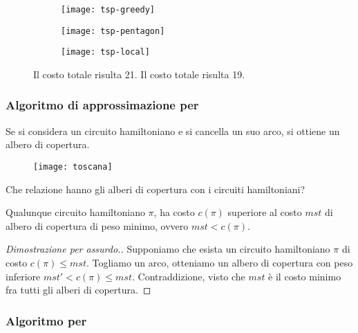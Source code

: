 \begin{figure}[H]\centering
	\hfill
	\begin{subfigure}[c]{.22\linewidth}\centering
		\texttt{[image: tsp-greedy]}
	\end{subfigure}%
	\hfill
	\begin{subfigure}[c]{.22\linewidth}\centering
		\texttt{[image: tsp-pentagon]}
	\end{subfigure}%
	\hfill
	\begin{subfigure}[c]{.22\linewidth}\centering
		\texttt{[image: tsp-local]}
	\end{subfigure}%
	\hfill\null
	\caption{Il costo totale risulta 21. Il costo totale risulta 19.}
\end{figure}

\subsubsection{Algoritmo di approssimazione per {\deltaTsp}}

Se si considera un circuito hamiltoniano e si cancella un suo arco, si ottiene un albero di copertura.

\begin{figure}[H]\centering
	\texttt{[image: toscana]}
\end{figure}

Che relazione hanno gli alberi di copertura con i circuiti hamiltoniani?

\begin{theorem*}
Qualunque circuito hamiltoniano \(\pi\), ha costo \(c(\pi)\) superiore al costo \(\mathit{mst}\) di albero di copertura di peso minimo, ovvero \(\mathit{mst} < c(\pi)\).
\end{theorem*}

\begin{proof}[Dimostrazione per assurdo.]
Supponiamo che esista un circuito hamiltoniano \(\pi\) di costo \(c(\pi) \leqslant \mathit{mst}\).
Togliamo un arco, otteniamo un albero di copertura con peso inferiore \(\mathit{mst}' < c(\pi) \leqslant \mathit{mst}\).
Contraddizione, visto che \(\mathit{mst}\) è il costo minimo fra tutti gli alberi di copertura.
\end{proof}

\subsubsection{Algoritmo per {\deltaTsp}}

